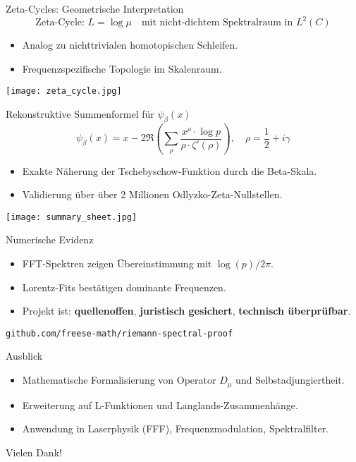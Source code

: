 \documentclass{beamer}
\begin{document}
\begin{frame}{Zeta-Cycles: Geometrische Interpretation}
  \[
    \text{Zeta-Cycle: } L = \log \mu \quad \text{mit nicht-dichtem Spektralraum in } L^2(C)
  \]
  \begin{itemize}
    \item Analog zu nichttrivialen homotopischen Schleifen.
    \item Frequenzspezifische Topologie im Skalenraum.
  \end{itemize}
  \texttt{[image: zeta\_cycle.jpg]}
\end{frame}

\begin{frame}{Rekonstruktive Summenformel für $\psi_\beta(x)$}
  \[
    \psi_\beta(x) = x - 2 \Re\left( \sum_{\rho} \frac{x^\rho \cdot \log p}{\rho \cdot \zeta'(\rho)} \right), \quad \rho = \frac{1}{2} + i\gamma
  \]
  \begin{itemize}
    \item Exakte Näherung der Tschebyschow-Funktion durch die Beta-Skala.
    \item Validierung über über 2 Millionen Odlyzko-Zeta-Nullstellen.
  \end{itemize}
  \texttt{[image: summary\_sheet.jpg]}
\end{frame}

\begin{frame}{Numerische Evidenz}
  \begin{itemize}
    \item FFT-Spektren zeigen Übereinstimmung mit $\log(p)/2\pi$.
    \item Lorentz-Fits bestätigen dominante Frequenzen.
    \item Projekt ist: \textbf{quellenoffen}, \textbf{juristisch gesichert}, \textbf{technisch überprüfbar}.
  \end{itemize}
  \vfill
  \texttt{github.com/freese-math/riemann-spectral-proof}
\end{frame}

\begin{frame}{Ausblick}
  \begin{itemize}
    \item Mathematische Formalisierung von Operator $D_\mu$ und Selbstadjungiertheit.
    \item Erweiterung auf L-Funktionen und Langlands-Zusammenhänge.
    \item Anwendung in Laserphysik (FFF), Frequenzmodulation, Spektralfilter.
  \end{itemize}
  \vfill
  Vielen Dank!
\end{frame}
\end{document}

